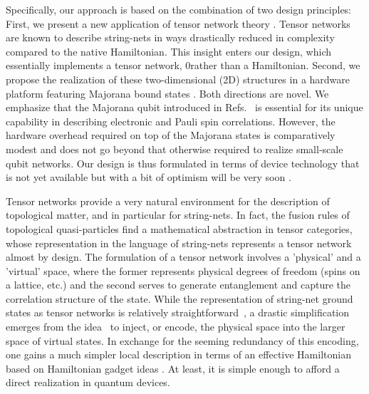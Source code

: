 \documentclass[twocolumn,floats,prx,showpacs]{revtex4-1}
\begin{document}
Specifically, our approach is based on the combination of two design principles: First, we present a new application of tensor network theory \cite{Orus-AnnPhys-2014,AreaReview,VerstraeteBig,SchuchReview}. 
Tensor networks are known to describe string-nets in ways drastically reduced in complexity compared to the native Hamiltonian. This insight enters our design, which essentially implements a tensor network, 0rather than a Hamiltonian. Second, we propose the realization of these two-dimensional (2D) structures in a hardware platform featuring Majorana bound states \cite{Alicea2012,Leijnse2012,Beenakker2013,Sarma2015,Aguado2017,Lutchyn2018,Mourik2012,Albrecht2016,Deng2016,Nichele2017,Gazi2017,Zhang2018}. Both directions are novel.  We emphasize  that the Majorana qubit introduced in Refs.~\cite{Beri2012,Beri2013,Altland2013,Plugge2017,Karzig2017} is essential for its unique capability in describing electronic and Pauli spin correlations. However, the hardware overhead required on top of the Majorana states is comparatively modest and does not go beyond that otherwise required to realize small-scale qubit networks. Our design is thus formulated in terms of device technology that is not yet available  but with a bit of optimism will be very soon \cite{Lutchyn2018}.

Tensor networks provide a very natural environment for the description of topological matter, and in particular for string\nobreakdash -nets. In fact, the fusion rules of topological quasi-particles find a mathematical abstraction in tensor categories,  whose representation in  the language of string-nets represents a tensor network almost by design. The formulation of a tensor network involves a   'physical' and a 'virtual' space, where the former represents physical  degrees of freedom (spins on a lattice, etc.) and the second serves to generate entanglement and capture the correlation structure of the state.  While the representation of string-net ground states as tensor networks is relatively straightforward~\cite{Gu2009,Buerschaper2009}, a drastic simplification emerges from the idea~\cite{Schuch_MPS,1409.2150,FermionicMPO,PhysRevB.95.245127} to inject, or encode, the physical space into the larger space of virtual states. In exchange for the seeming redundancy of this encoding, one gains a much simpler local description in terms of an effective Hamiltonian \cite{Brell2014PEPS} based on Hamiltonian gadget ideas \cite{Kempe-SIAM-2006, PhysRevA.77.062329}. At least, it is simple enough to afford a direct realization in quantum devices.
\end{document}
